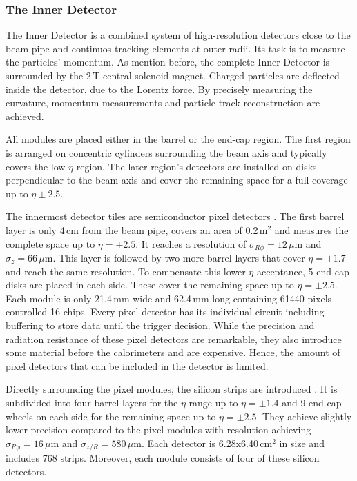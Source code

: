 \documentclass[bachelor,ngerman,english]{GAUBM}
\begin{document}
\subsubsection*{The Inner Detector}
The Inner Detector \cite{atlas:tech_design_report_inner_01,atlas:tech_design_report_inner_02} is a combined system of high-resolution detectors close to the beam pipe and continuos tracking elements at outer radii. Its task is to measure the particles' momentum. As mention before, the complete Inner Detector is surrounded by the 2\,T central solenoid magnet. Charged particles are deflected inside the detector, due to the Lorentz force. By precisely measuring the curvature, momentum measurements and particle track reconstruction are achieved.

All modules are placed either in the barrel or the end-cap region. The first region is arranged on concentric cylinders surrounding the beam axis and typically covers the low $\eta$ region. The later region's detectors are installed on disks perpendicular to the beam axis and cover the remaining space for a full coverage up to $\eta\pm2.5$.

The innermost detector tiles are semiconductor pixel detectors \cite{atlas:tech_design_report_01,atlas:pixel_detector}. The first barrel layer is only 4\,cm from the beam pipe, covers an area of 0.2\,m$^2$ and measures the complete space up to $\eta=\pm2.5$. It reaches a resolution of $\sigma_{R\phi}=12\,\mu\text{m}$ and $\sigma_{z}=66\,\mu\text{m}$. This layer is followed by two more barrel layers that cover $\eta=\pm1.7$ and reach the same resolution. To compensate this lower $\eta$ acceptance, 5 end-cap disks are placed in each side. These cover the remaining space up to $\eta=\pm2.5$. Each module is only 21.4\,mm wide and 62.4\,mm long containing 61440 pixels controlled 16 chips. Every pixel detector has its individual circuit including buffering to store data until the trigger decision. While the precision and radiation resistance of these pixel detectors are remarkable, they also introduce some material before the calorimeters and are expensive. Hence, the amount of pixel detectors that can be included in the detector is limited. 

Directly surrounding the pixel modules, the silicon strips are introduced \cite{atlas:tech_design_report_01,atlas:strip_detector}. It is subdivided into four barrel layers for the $\eta$ range up to $\eta=\pm1.4$ and 9 end-cap wheels on each side for the remaining space up to $\eta=\pm2.5$. They achieve slightly lower precision compared to the pixel modules with resolution achieving $\sigma_{R\phi}=16\,\mu\text{m}$ and $\sigma_{z/R}=580\,\mu\text{m}$. Each detector is 6.28x6.40\,cm$^2$ in size and includes 768 strips. Moreover, each module consists of four of these silicon detectors.
\end{document}
